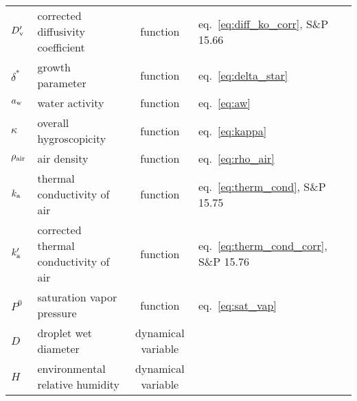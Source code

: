 \documentclass{article}
\begin{document}
\begin{tabular}{lp{4cm}clp{3cm}}
$D_{\rm v}'$     & corrected diffusivity coefficient   &  function & eq.~\ref{eq:diff_ko_corr}, S\&P 15.66  \\
$\delta^*$  & growth parameter & function & eq.~\ref{eq:delta_star}\\
$a_{\rm w}$  & water activity  & function & eq.~\ref{eq:aw}   \\
$\kappa$      &  overall hygroscopicity   &  function &  eq.~\ref{eq:kappa}  \\
$ \rho_{\rm air}$    &  air density   &  function &  eq.~\ref{eq:rho_air}  \\
$k_{\rm a} $     & thermal conductivity of air    &  function&  eq.~\ref{eq:therm_cond}, S\&P 15.75   \\
$k_{\rm a}' $    & corrected thermal conductivity of air    &  function &  eq.~\ref{eq:therm_cond_corr}, S\&P 15.76   \\
$P^0$   & saturation vapor pressure &  function & eq.~\ref{eq:sat_vap}  \\
$D$     &  droplet wet diameter  & dynamical variable  &     \\
$H$     &  environmental relative humidity  &  dynamical variable &  \\

\hline 
\end{tabular}
\end{document}
